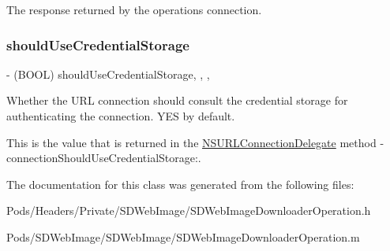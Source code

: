 The response returned by the operation\textquotesingle{}s connection. \mbox{\label{interface_s_d_web_image_downloader_operation_a14ddcfc11ad65f0cff5c11e8cda517bc}} 
\subsubsection{\texorpdfstring{should\+Use\+Credential\+Storage}{shouldUseCredentialStorage}}
{\footnotesize\ttfamily -\/ (B\+O\+OL) should\+Use\+Credential\+Storage\hspace{0.3cm}{\ttfamily [read]}, {\ttfamily [write]}, {\ttfamily [nonatomic]}, {\ttfamily [assign]}}

Whether the U\+RL connection should consult the credential storage for authenticating the connection. {\ttfamily Y\+ES} by default.

This is the value that is returned in the {\ttfamily \mbox{\hyperlink{class_n_s_u_r_l_connection_delegate-p}{N\+S\+U\+R\+L\+Connection\+Delegate}}} method {\ttfamily -\/connection\+Should\+Use\+Credential\+Storage\+:}. 

The documentation for this class was generated from the following files\+:\begin{DoxyCompactItemize}
\item 
Pods/\+Headers/\+Private/\+S\+D\+Web\+Image/S\+D\+Web\+Image\+Downloader\+Operation.\+h\item 
Pods/\+S\+D\+Web\+Image/\+S\+D\+Web\+Image/S\+D\+Web\+Image\+Downloader\+Operation.\+m\end{DoxyCompactItemize}
